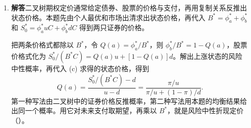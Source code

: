 \begin{solution}[blank-type=manual,blank-vsep=10\baselineskip]
\begin{enumerate}[label=(\alph*)]
 将两种状态下的个人需求分别相加，再代入 $W$，得到
 \[
 \begin{aligned}
 uC &= \sum_k c_{k,a}^*=\frac{\rho\pi W}{(1+\rho)\phi_a^*}
     =\frac{\rho\pi C}{\phi_a^*},\\
 dC &= \sum_k c_{k,b}^*=\frac{\rho(1-\pi)W}{(1+\rho)\phi_b^*}
     =\frac{\rho(1-\pi)C}{\phi_b^*}.
 \end{aligned}
 \]

 所以 $\phi_a^*=\rho\pi/u$、$\phi_b^*=\rho(1-\pi)/d$。按各状态的支付定价，
 \[
 B^*=\phi_a^*+\phi_b^*=\rho\left(\frac\pi u+\frac{1-\pi}d\right),
 \qquad S_0^*=\phi_a^* uC+\phi_b^* dC=\rho C.
 \]

 此时按禀赋计算的总财富为 $C+S_0^*=(1+\rho)C$，与当期出清求出的 $W$ 一致。

 代回需求，$c_{k,0}^*=s_kC$、$c_{k,a}^*=s_kuC$、$c_{k,b}^*=s_kdC$。由 $\sum_k s_k=1$，三项消费分别加总为 $C,uC,dC$。各人的净交易 $\theta_{k,B}^*=\theta_{k,S}^*=0$，证券市场也出清。

 \item \textbf{解答}\quad 二叉树期权定价通常给定债券、股票的价格与支付，再用复制关系反推出状态价格。本题先由个人最优和市场出清求出状态价格，再代入 $B^*=\phi_a^*+\phi_b^*$ 和 $S_0^*=\phi_a^*uC+\phi_b^*dC$ 得到两只证券的价格。

 把两条价格式都除以 $B^*$，令 $Q(a)=\phi_a^*/B^*$，则 $\phi_b^*/B^*=1-Q(a)$，股票价格式化为 $S_0^*/(B^*C)=Q(a)u+[1-Q(a)]d$。解出上涨状态的风险中性概率，再代入 (c) 求得的状态价格，得到
 \[
 Q(a)=\frac{S_0^*/(B^*C)-d}{u-d}
 =\frac{\pi/u}{\pi/u+(1-\pi)/d}.
 \]
 第一种写法由二叉树中的证券价格反推概率，第二种写法用本题的均衡结果给出同一个概率。用它对未来支付取期望，再乘以 $B^*$，就是风险中性折现定价\ifdefined\WJHandoutKnowledge（）\fi。
\end{enumerate}
\end{solution}

